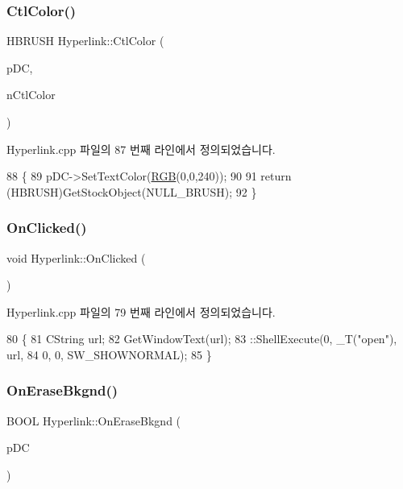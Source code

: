 \subsubsection{\texorpdfstring{Ctl\+Color()}{CtlColor()}}
{\footnotesize\ttfamily H\+B\+R\+U\+SH Hyperlink\+::\+Ctl\+Color (\begin{DoxyParamCaption}\item[{C\+DC $\ast$}]{p\+DC,  }\item[{U\+I\+NT}]{n\+Ctl\+Color }\end{DoxyParamCaption})\hspace{0.3cm}{\ttfamily [protected]}}



Hyperlink.\+cpp 파일의 87 번째 라인에서 정의되었습니다.


\begin{DoxyCode}
88 \{
89   pDC->SetTextColor(\mbox{\hyperlink{bilinear_8cpp_a4a118ad3ee36468a3fa616977a64864e}{RGB}}(0,0,240));
90     
91   \textcolor{keywordflow}{return} (HBRUSH)GetStockObject(NULL\_BRUSH);
92 \}
\end{DoxyCode}
\mbox{\label{class_hyperlink_a9fc8208b20a3f28c07bbb66aafe6fbee}} 
\subsubsection{\texorpdfstring{On\+Clicked()}{OnClicked()}}
{\footnotesize\ttfamily void Hyperlink\+::\+On\+Clicked (\begin{DoxyParamCaption}{ }\end{DoxyParamCaption})}



Hyperlink.\+cpp 파일의 79 번째 라인에서 정의되었습니다.


\begin{DoxyCode}
80 \{
81   CString url;
82   GetWindowText(url);
83   ::ShellExecute(0, \_T(\textcolor{stringliteral}{"open"}), url, 
84                  0, 0, SW\_SHOWNORMAL);
85 \}
\end{DoxyCode}
\mbox{\label{class_hyperlink_a0af05ff8e84693b9bb575a814c2e46b9}} 
\subsubsection{\texorpdfstring{On\+Erase\+Bkgnd()}{OnEraseBkgnd()}}
{\footnotesize\ttfamily B\+O\+OL Hyperlink\+::\+On\+Erase\+Bkgnd (\begin{DoxyParamCaption}\item[{C\+DC $\ast$}]{p\+DC }\end{DoxyParamCaption})\hspace{0.3cm}{\ttfamily [protected]}}



